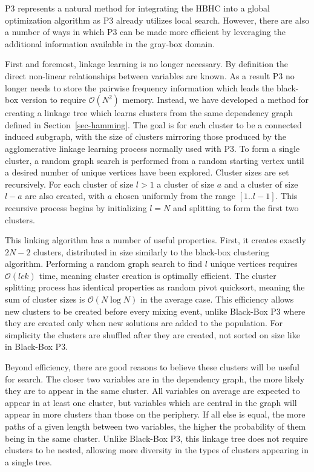 \documentclass{sig-alternate}
\newcommand{\BigO}[1]{$\mathcal{O}{(#1)}$}
\begin{document}
P3 represents a natural method for integrating the HBHC into
a global optimization algorithm as P3 already utilizes local search. However, there
are also a number of ways in which P3 can be made more efficient by leveraging the
additional information available in the gray-box domain.

First and foremost, linkage learning is no longer necessary. By definition
the direct non-linear relationships between variables are known. As a result
P3 no longer needs to store the pairwise frequency information which leads
the black-box version to require \BigO{N^2} memory. Instead,
we have developed a method for creating a linkage tree which learns clusters
from the same dependency graph defined in Section~\ref{sec-hamming}. The goal is for each
cluster to be a connected induced subgraph, with the size of clusters
mirroring those produced by the agglomerative linkage learning process normally
used with P3. To form a single cluster, a random graph search is performed from
a random starting vertex until a desired number of unique vertices have been explored.
Cluster sizes are set recursively. For each cluster of size $l>1$
a cluster of size $a$ and a cluster of size $l-a$ are also created, with $a$ chosen uniformly
from the range $[1..l-1]$. This recursive process begins by initializing $l=N$ and splitting
to form the first two clusters.

This linking algorithm has a number of useful properties. First, it creates exactly
$2N-2$ clusters, distributed in size similarly to the black-box clustering algorithm.
Performing a random graph search to find $l$ unique vertices requires \BigO{lck} time,
meaning cluster creation is optimally efficient.
The cluster splitting process has identical properties as random pivot quicksort,
meaning the sum of cluster sizes is \BigO{N\log N} in the average case.
This efficiency allows new clusters to be created before every mixing event,
unlike Black-Box P3 where they are created only when new solutions are added to the population.
For simplicity the clusters are shuffled after they are created, not sorted on size like in
Black-Box P3.

Beyond efficiency, there are good reasons to believe these clusters will be useful
for search. The closer two variables are in the dependency graph, the more likely
they are to appear in the same cluster. All variables on average are expected to appear
in at least one cluster, but variables which are central in the graph will appear in more
clusters than those on the periphery. If all else is equal, the more paths of a given
length between two variables, the higher the probability of them being in the same cluster.
Unlike Black-Box P3, this linkage tree does not require clusters to be nested, allowing
more diversity in the types of clusters appearing in a single tree.
\end{document}
